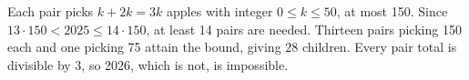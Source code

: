 Each pair picks $k+2k=3k$ apples with integer $0\le k\le50$, at most 150. Since $13\cdot150<2025\le14\cdot150$, at least 14 pairs are needed. Thirteen pairs picking 150 each and one picking 75 attain the bound, giving $\boxed{28}$ children. Every pair total is divisible by 3, so 2026, which is not, is impossible.
